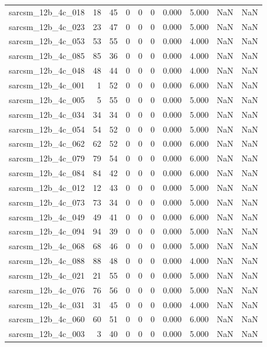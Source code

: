 \documentclass{article}
\begin{document}
\begin{longtable}{lrrrrrrrrr}
sarcsm\_12b\_4c\_018 & 18 & 45 & 0 & 0 & 0 & 0.000 & 5.000 & NaN & NaN \\
sarcsm\_12b\_4c\_023 & 23 & 47 & 0 & 0 & 0 & 0.000 & 5.000 & NaN & NaN \\
sarcsm\_12b\_4c\_053 & 53 & 55 & 0 & 0 & 0 & 0.000 & 4.000 & NaN & NaN \\
sarcsm\_12b\_4c\_085 & 85 & 36 & 0 & 0 & 0 & 0.000 & 4.000 & NaN & NaN \\
sarcsm\_12b\_4c\_048 & 48 & 44 & 0 & 0 & 0 & 0.000 & 4.000 & NaN & NaN \\
sarcsm\_12b\_4c\_001 & 1 & 52 & 0 & 0 & 0 & 0.000 & 6.000 & NaN & NaN \\
sarcsm\_12b\_4c\_005 & 5 & 55 & 0 & 0 & 0 & 0.000 & 5.000 & NaN & NaN \\
sarcsm\_12b\_4c\_034 & 34 & 34 & 0 & 0 & 0 & 0.000 & 5.000 & NaN & NaN \\
sarcsm\_12b\_4c\_054 & 54 & 52 & 0 & 0 & 0 & 0.000 & 5.000 & NaN & NaN \\
sarcsm\_12b\_4c\_062 & 62 & 52 & 0 & 0 & 0 & 0.000 & 6.000 & NaN & NaN \\
sarcsm\_12b\_4c\_079 & 79 & 54 & 0 & 0 & 0 & 0.000 & 6.000 & NaN & NaN \\
sarcsm\_12b\_4c\_084 & 84 & 42 & 0 & 0 & 0 & 0.000 & 6.000 & NaN & NaN \\
sarcsm\_12b\_4c\_012 & 12 & 43 & 0 & 0 & 0 & 0.000 & 5.000 & NaN & NaN \\
sarcsm\_12b\_4c\_073 & 73 & 34 & 0 & 0 & 0 & 0.000 & 5.000 & NaN & NaN \\
sarcsm\_12b\_4c\_049 & 49 & 41 & 0 & 0 & 0 & 0.000 & 6.000 & NaN & NaN \\
sarcsm\_12b\_4c\_094 & 94 & 39 & 0 & 0 & 0 & 0.000 & 5.000 & NaN & NaN \\
sarcsm\_12b\_4c\_068 & 68 & 46 & 0 & 0 & 0 & 0.000 & 5.000 & NaN & NaN \\
sarcsm\_12b\_4c\_088 & 88 & 48 & 0 & 0 & 0 & 0.000 & 4.000 & NaN & NaN \\
sarcsm\_12b\_4c\_021 & 21 & 55 & 0 & 0 & 0 & 0.000 & 5.000 & NaN & NaN \\
sarcsm\_12b\_4c\_076 & 76 & 56 & 0 & 0 & 0 & 0.000 & 5.000 & NaN & NaN \\
sarcsm\_12b\_4c\_031 & 31 & 45 & 0 & 0 & 0 & 0.000 & 4.000 & NaN & NaN \\
sarcsm\_12b\_4c\_060 & 60 & 51 & 0 & 0 & 0 & 0.000 & 6.000 & NaN & NaN \\
sarcsm\_12b\_4c\_003 & 3 & 40 & 0 & 0 & 0 & 0.000 & 5.000 & NaN & NaN \\

\end{longtable}
\end{document}
